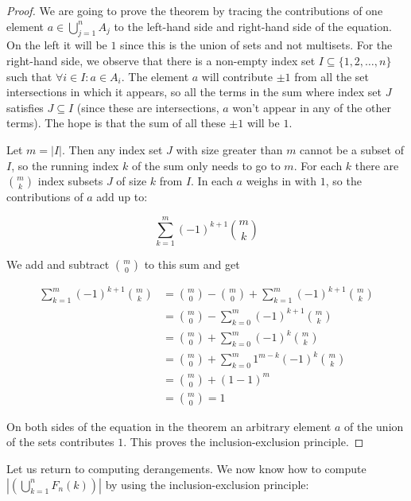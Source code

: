 \begin{proof}

We are going to prove the theorem by tracing the contributions of one element $a \in \bigcup_{j = 1}^n A_j$ to the left-hand side and right-hand side of the equation. On the left it will be $1$ since this is the union of sets and not multisets. For the right-hand side, we observe that there is a non-empty index set $I \subseteq \{1, 2, \ldots, n\}$ such that $\forall i \in I: a \in A_i$. The element $a$ will contribute $\pm 1$ from all the set intersections in which it appears, so all the terms in the sum where index set $J$ satisfies $J \subseteq I$ (since these are intersections, $a$ won't appear in any of the other terms). The hope is that the sum of all these $\pm 1$ will be $1$.

Let $m = |I|$. Then any index set $J$ with size greater than $m$ cannot be a subset of $I$, so the running index $k$ of the sum only needs to go to $m$. For each $k$ there are $\binom{m}{k}$ index subsets $J$ of size $k$ from $I$. In each $a$ weighs in with $1$, so the contributions of $a$ add up to:

$$
\sum_{k = 1}^m (-1)^{k + 1} \binom{m}{k}
$$ 

We add and subtract $\binom{m}{0}$ to this sum and get

$$
\begin{aligned}
\sum_{k = 1}^m (-1)^{k + 1} \binom{m}{k} & = \binom{m}{0} - \binom{m}{0} + \sum_{k = 1}^m (-1)^{k + 1} \binom{m}{k} \\
                                         & = \binom{m}{0} - \sum_{k = 0}^m (-1)^{k + 1} \binom{m}{k} \\
                                         & = \binom{m}{0} + \sum_{k = 0}^m (-1)^k \binom{m}{k} \\
                                         & = \binom{m}{0} + \sum_{k = 0}^m 1^{m-k} (-1)^k \binom{m}{k} \\
                                         & = \binom{m}{0} + (1 - 1)^m \\
                                         & = \binom{m}{0} = 1
\end{aligned}
$$
	
On both sides of the equation in the theorem an arbitrary element $a$ of the union of the sets contributes $1$. This proves the inclusion-exclusion principle.	
\end{proof}

Let us return to computing derangements. We now know how to compute $|(\bigcup_{k = 1}^n F_n(k))|$ by using the inclusion-exclusion principle:

